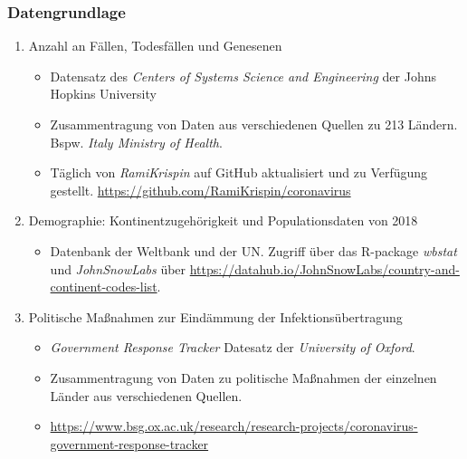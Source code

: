 \documentclass{beamer}
\begin{document}
 \begin{frame}
 	\frametitle{Datengrundlage}
 	\begin{enumerate}
 		\item Anzahl an Fällen, Todesfällen und Genesenen
 		\begin{itemize}
 			\item Datensatz des \emph{Centers of Systems Science and Engineering} der Johns Hopkins University
 			\item Zusammentragung von Daten aus verschiedenen Quellen zu 213 Ländern. Bspw. \emph{Italy Ministry of Health}.
 			\item Täglich von \emph{RamiKrispin} auf GitHub aktualisiert und zu Verfügung gestellt. \url{https://github.com/RamiKrispin/coronavirus}
 	\pause
 		\end{itemize}
 		\item Demographie: Kontinentzugehörigkeit und Populationsdaten von 2018
 		\begin{itemize}
 			\item Datenbank der Weltbank und der UN. Zugriff über das R-package \emph{wbstat} und \emph{JohnSnowLabs} über \url{https://datahub.io/JohnSnowLabs/country-and-continent-codes-list}.
 		\end{itemize}
 	\pause
 		\item Politische Maßnahmen zur Eindämmung der Infektionsübertragung
 		\begin{itemize}
 			\item \emph{Government Response Tracker} Datesatz der \emph{University of Oxford}.
 			\item Zusammentragung von Daten zu politische Maßnahmen der einzelnen Länder aus verschiedenen Quellen.
 			\item \url{https://www.bsg.ox.ac.uk/research/research-projects/coronavirus-government-response-tracker}
 		\end{itemize}
 	\end{enumerate} 
 \end{frame}
\end{document}
